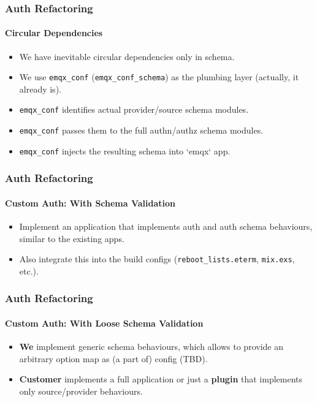 \documentclass{beamer}
\begin{document}
\begin{frame}[fragile]
    \frametitle{Auth Refactoring}
    \framesubtitle{Circular Dependencies}

    \begin{center}
        \begin{itemize}
            \item We have inevitable circular dependencies only in schema.
            \item We use \lstinline{emqx_conf} (\lstinline{emqx_conf_schema}) as the plumbing layer (actually, it already is).
            \item \lstinline{emqx_conf} identifies actual provider/source schema modules.
            \item \lstinline{emqx_conf} passes them to the full authn/authz schema modules.
            \item \lstinline{emqx_conf} injects the resulting schema into `emqx` app.
        \end{itemize}
    \end{center}
\end{frame}

\begin{frame}
    \frametitle{Auth Refactoring}
    \framesubtitle{Custom Auth: With Schema Validation}

    \begin{center}
        \begin{itemize}
            \item Implement an application that implements auth and auth schema behaviours, similar to the existing apps.
            \item Also integrate this into the build configs (\lstinline{reboot_lists.eterm}, \lstinline{mix.exs}, etc.).
        \end{itemize}
    \end{center}
\end{frame}

\begin{frame}
    \frametitle{Auth Refactoring}
    \framesubtitle{Custom Auth: With Loose Schema Validation}

    \begin{center}
        \begin{itemize}
            \item \textbf{We} implement generic schema behaviours, which allows to provide an arbitrary option map as (a part of) config (TBD).
            \item \textbf{Customer} implements a full application or just a \textbf{plugin} that implements only source/provider behaviours.
        \end{itemize}
    \end{center}
\end{frame}
\end{document}
